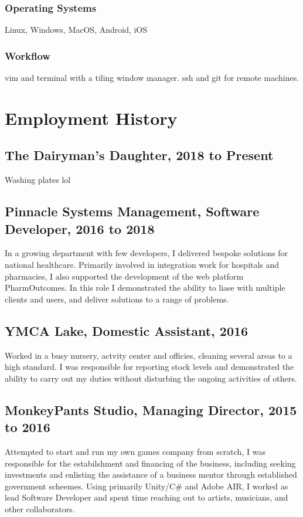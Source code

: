 \documentclass{article}
\begin{document}
\subsubsection{Operating Systems}
Linux, Windows, MacOS, Android, iOS
\subsubsection{Workflow}
vim and terminal with a tiling window manager. ssh and git for remote machines.

\section{Employment History}
\subsection{The Dairyman's Daughter, 2018 to Present}
Washing plates lol
\subsection{Pinnacle Systems Management, Software Developer, 2016 to 2018}
In a growing department with few developers, I delivered bespoke solutions for national healthcare.  Primarily involved in integration work for hospitals and pharmacies, I also supported the development of the web platform PharmOutcomes.  In this role I demonstrated the ability to liase with multiple clients and users, and deliver solutions to a range of problems.
\subsection{YMCA Lake, Domestic Assistant, 2016}
Worked in a busy nursery, actvity center and officies, cleaning several areas to a high standard.  I was responsible for reporting stock levels and demonstrated the ability to carry out my duties without disturbing the ongoing activities of others.
\subsection{MonkeyPants Studio, Managing Director, 2015 to 2016}
Attempted to start and run my own games company from scratch, I was responsible for the estabilshment and financing of the business, including seeking investments and enlisting the assistance of a business mentor through established government scheemes.  Using primarily Unity/C\# and Adobe AIR, I worked as lead Software Developer and spent time reaching out to artists, musicians, and other collaborators.
\end{document}
